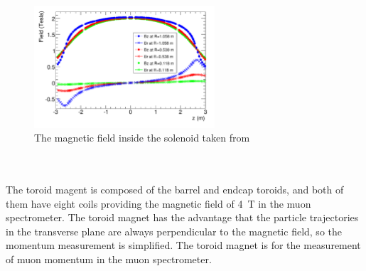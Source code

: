 \begin{figure}[!h]                
	\includegraphics[width=0.6\textwidth]{Chapter2/bfield}
	\centering
	\begin{center}
		\caption{The magnetic field inside the solenoid taken from \cite{Aleksa_2008}}
		\label{Fig:bfield}            
	\end{center}
\end{figure}
\\
\\The toroid magent is composed of the barrel and endcap toroids, and both of them have eight coils providing the magnetic field of 4~T in the muon spectrometer. The toroid magnet has the advantage that the particle trajectories in the transverse plane are always perpendicular to the magnetic field, so the momentum measurement is simplified. The toroid magnet is for the measurement of muon momentum in the muon spectrometer. 
